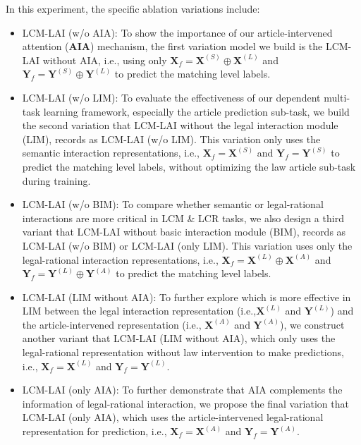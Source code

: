 In this experiment, the specific ablation variations include:
\begin{itemize} 
    \item {
    LCM-LAI (w/o AIA): To show the importance of our article-intervened attention (\textbf{AIA}) mechanism, the first variation model we build is the LCM-LAI without AIA, i.e., using only 
    $\mathbf{X}_f = \mathbf{X}^{(S)} \oplus \mathbf{X}^{(L)}$ and $\mathbf{Y}_f = \mathbf{Y}^{(S)} \oplus \mathbf{Y}^{(L)}$ to predict the matching level labels.
    }
    \item {
    LCM-LAI (w/o LIM): To evaluate the effectiveness of our dependent multi-task learning framework, especially the article prediction sub-task, we build the second variation that LCM-LAI without the legal interaction module (LIM), records as LCM-LAI (w/o LIM).
    This variation only uses the semantic interaction representations, i.e., $\mathbf{X}_f = \mathbf{X}^{(S)}$ and $\mathbf{Y}_f = \mathbf{Y}^{(S)}$ to predict the matching level labels, without optimizing the law article sub-task during training.
    }

    \item {
    LCM-LAI (w/o BIM): To compare whether semantic or legal-rational interactions are more critical in LCM \& LCR tasks, we also design a third variant that LCM-LAI without basic interaction module (BIM), records as LCM-LAI (w/o BIM) or LCM-LAI (only LIM).
    This variation uses only the legal-rational interaction representations, i.e., $\mathbf{X}_f = \mathbf{X}^{(L)} \oplus \mathbf{X}^{(A)}$ and $\mathbf{Y}_f = \mathbf{Y}^{(L)} \oplus \mathbf{Y}^{(A)}$ to predict the matching level labels.
    }
    \item{
    LCM-LAI (LIM without AIA): To further explore which is more effective in LIM between the legal interaction representation (i.e.,$\mathbf{X}^{(L)}$ and $\mathbf{Y}^{(L)}$) and the article-intervened representation (i.e., $\mathbf{X}^{(A)}$ and $\mathbf{Y}^{(A)}$), we construct another variant that LCM-LAI (LIM without AIA), which only uses the legal-rational representation without law intervention to make predictions, i.e., $\mathbf{X}_f = \mathbf{X}^{(L)}$ and $\mathbf{Y}_f = \mathbf{Y}^{(L)}$.
    }
    \item {
    LCM-LAI (only AIA): To further demonstrate that AIA complements the information of legal-rational interaction, we propose the final variation that LCM-LAI (only AIA), which uses the article-intervened legal-rational representation for prediction, i.e., $\mathbf{X}_f = \mathbf{X}^{(A)}$ and $\mathbf{Y}_f = \mathbf{Y}^{(A)}$.
    }
\end{itemize}

